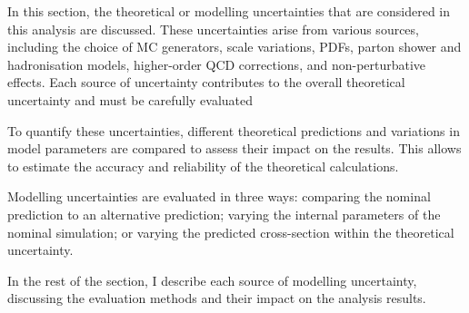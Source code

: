 In this section, the theoretical or modelling uncertainties that are considered in this analysis are discussed. 
These uncertainties arise from various sources, including the choice of MC generators, scale variations, 
PDFs, parton shower and hadronisation models, higher-order QCD corrections, and non-perturbative 
effects. Each source of uncertainty contributes to the overall theoretical uncertainty and must be 
carefully evaluated

To quantify these uncertainties, different theoretical predictions and variations in model parameters are 
compared to assess their impact on the results. This allows to estimate the accuracy and reliability of 
the theoretical calculations.

Modelling uncertainties are evaluated in three ways: 
comparing the nominal prediction to an alternative prediction; 
varying the internal parameters of the nominal simulation; 
or varying the predicted cross-section within the theoretical uncertainty.

In the rest of the section, I describe each source of modelling uncertainty, discussing the 
evaluation methods and their impact on the analysis results. 



